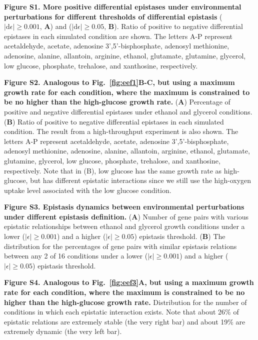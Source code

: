 \documentclass[10pt]{article}
\def\D{\mathrm{d}}
\newcommand{\Fig}{Fig.}
\begin{document}
\begin{description}
\item {\bf Figure S1. More positive differential epistases under environmental perturbations
for different thresholds of differential epistasis}
($\left|\D\epsilon\right| \geq 0.001$, \textbf{A}) and
($\left|\D\epsilon\right| \geq 0.05$, \textbf{B}). Ratio of positive
to negative differential epistases in each simulated condition are
shown. The letters A-P represent acetaldehyde, acetate, adenosine
3',5'-bisphosphate, adenosyl methionine, adenosine, alanine,
allantoin, arginine, ethanol, glutamate, glutamine, glycerol, low
glucose, phosphate, trehalose, and xanthosine, respectively.

\item {\bf Figure S2. Analogous to \Fig~\ref{fig:eef1}B-C, but using a
maximum growth rate for each condition, where the maximum is
constrained to be no higher than the high-glucose growth rate.}
(\textbf{A}) Percentage of positive and negative differential
epistases under ethanol and glycerol conditions. (\textbf{B}) Ratio of
positive to negative differential epistases in each simulated
condition. The result from a high-throughput experiment is also
shown. The letters A-P represent acetaldehyde, acetate, adenosine
3',5'-bisphosphate, adenosyl methionine, adenosine, alanine,
allantoin, arginine, ethanol, glutamate, glutamine, glycerol, low
glucose, phosphate, trehalose, and xanthosine, respectively. Note that
in (B), low glucose has the same growth rate as high-glucose, but has
different epistatic interactions since we still use the high-oxygen
uptake level associated with the low glucose condition.

\item {\bf Figure S3. Epistasis dynamics between environmental
perturbations under different epistasis definition.} (\textbf{A})
Number of gene pairs with various epistatic relationships between
ethanol and glycerol growth conditions under a lower
($\left|\epsilon\right| \geq 0.001$) and a higher
($\left|\epsilon\right| \geq 0.05$) epistasis threshold. (\textbf{B})
The distribution for the percentages of gene pairs with similar
epistasis relations between any 2 of 16 conditions under a lower
($\left|\epsilon\right| \geq 0.001$) and a higher
($\left|\epsilon\right| \geq 0.05$) epistasis threshold.

\item {\bf Figure S4. Analogous to \Fig~\ref{fig:eef3}A, but using a
maximum growth rate for each condition, where the maximum is
constrained to be no higher than the high-glucose growth rate.}
Distribution for the number of conditions in which each epistatic
interaction exists. Note that about 26\% of epistatic relations are
extremely stable (the very right bar) and about 19\% are extremely
dynamic (the very left bar). 


\end{description}
\end{document}

